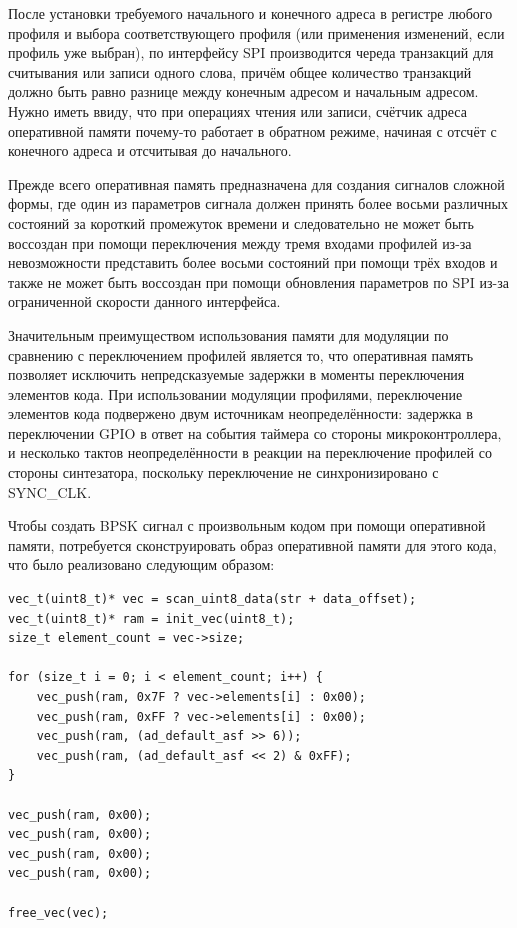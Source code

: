 \documentclass[rusmathsym, eqnumwithinsec, amspack, hyperref]{bomgost}
\begin{document}
После установки требуемого начального и конечного адреса в регистре любого профиля и выбора соответствующего профиля (или применения изменений, если профиль уже выбран), по интерфейсу SPI производится череда транзакций для считывания или записи одного слова, причём общее количество транзакций должно быть равно разнице между конечным адресом и начальным адресом. Нужно иметь ввиду, что при операциях чтения или записи, счётчик адреса оперативной памяти почему-то работает в обратном режиме, начиная с отсчёт с конечного адреса и отсчитывая до начального.


Прежде всего оперативная память предназначена для создания сигналов сложной формы, где один из параметров сигнала должен принять более восьми различных состояний за короткий промежуток времени и следовательно не может быть воссоздан при помощи переключения между тремя входами профилей из-за невозможности представить более восьми состояний при помощи трёх входов и также не может быть воссоздан при помощи обновления параметров по SPI из-за ограниченной скорости данного интерфейса.

Значительным преимуществом использования памяти для модуляции по сравнению с переключением профилей является то, что оперативная память позволяет исключить непредсказуемые задержки в моменты переключения элементов кода. При использовании модуляции профилями, переключение элементов кода подвержено двум источникам неопределённости: задержка в переключении GPIO в ответ на события таймера со стороны микроконтроллера, и несколько тактов неопределённости в реакции на переключение профилей со стороны синтезатора, поскольку переключение не синхронизировано с SYNC\_CLK.

Чтобы создать BPSK сигнал с произвольным кодом при помощи оперативной памяти, потребуется сконструировать образ оперативной памяти для этого кода, что было реализовано следующим образом:

\lstset{
	language=c,
	basicstyle=\scriptsize\ttfamily,
	numbers=left,
	stepnumber=1,
	showstringspaces=false,
	tabsize=4,
	breaklines=true,
	breakatwhitespace=false,
	xleftmargin=.1\textwidth, xrightmargin=.1\textwidth,
	belowskip=1em, aboveskip=1em
}
\begin{lstlisting}
vec_t(uint8_t)* vec = scan_uint8_data(str + data_offset);
vec_t(uint8_t)* ram = init_vec(uint8_t);
size_t element_count = vec->size;

for (size_t i = 0; i < element_count; i++) {
	vec_push(ram, 0x7F ? vec->elements[i] : 0x00);
	vec_push(ram, 0xFF ? vec->elements[i] : 0x00);
	vec_push(ram, (ad_default_asf >> 6));
	vec_push(ram, (ad_default_asf << 2) & 0xFF);
}

vec_push(ram, 0x00);
vec_push(ram, 0x00);
vec_push(ram, 0x00);
vec_push(ram, 0x00);

free_vec(vec);
\end{lstlisting}
\end{document}
